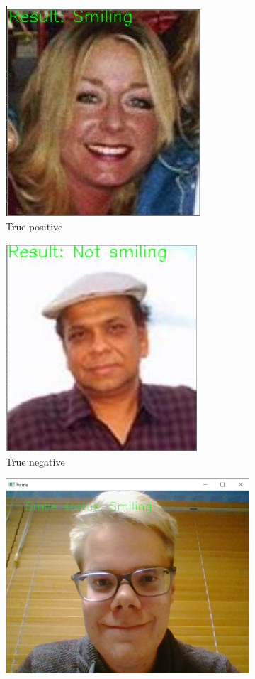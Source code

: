 \documentclass{article}
\begin{document}
\begin{figure}[t]
  \begin{minipage}[t]{0.5\textwidth}\centering
    \begin{subfigure}[t]{0.5\linewidth}\centering
      \includegraphics[width=0.5\linewidth]{figures/example1.jpg}
      \caption{True positive}
    \end{subfigure}%
    \begin{subfigure}[t]{0.5\linewidth}\centering
      \includegraphics[width=0.5\linewidth]{figures/example2.jpg}
      \caption{True negative}
    \end{subfigure}
    \caption{Qualitative samples from the test data}\label{fig:tptn}
  \end{minipage}%
  \begin{minipage}[t]{0.5\textwidth}\centering
    \begin{subfigure}[t]{0.5\linewidth}\centering
      \includegraphics[width=0.5\linewidth]{figures/camera_example1.jpg}

\end{subfigure}
\end{minipage}
\end{figure}
\end{document}
